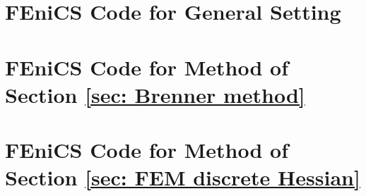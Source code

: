 \section{FEniCS Code for General Setting}


\section{FEniCS Code for Method of Section \ref{sec: Brenner method}} \label{app: Code Brenner}

\section{FEniCS Code for Method of Section \ref{sec: FEM discrete Hessian}} \label{app: Code Neilan}

